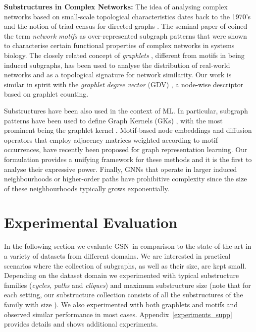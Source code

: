 \documentclass{article} \usepackage{iclr2021_conference,times}
\newcommand{\modelname}{GSN}
\begin{document}
\noindent\textbf{Substructures in Complex Networks: }The idea of analysing complex networks based on small-scale topological characteristics dates back to the 1970's and the notion of triad census for directed graphs \citep{holland1976local}. The seminal paper of \cite{milo2002network} coined the term \textit{network motifs} as over-represented subgraph patterns that were shown to characterise certain functional properties of complex networks in systems biology.  The closely related concept of  \textit{graphlets} \citep{prvzulj2004modeling, prvzulj2007biological, milenkovic2008uncovering, sarajlic2016graphlet}, different from motifs in being induced subgraphs, has been used to analyse the distribution of real-world networks and as a topological signature for network similarity. Our work is similar in spirit with the {\em graphlet degree vector} (GDV) \citep{prvzulj2007biological}, a node-wise descriptor based on graphlet counting. 

Substructures have been also used in the context of ML. In particular, subgraph patterns have been used to define Graph Kernels (GKs) \citep{horvath2004cyclic, shervashidze2009efficient, costa2010fast, DBLP:conf/icml/KriegeM12, nt2020graph}, with the most prominent being the graphlet kernel \citep{shervashidze2009efficient}. Motif-based node embeddings \citep{motif2vec, rossi-HONE-arxiv} and diffusion operators  \citep{motifnet, sankar2019meta, lee19-motif-attention}  that employ adjacency matrices weighted according to motif occurrences, have recently been proposed for graph representation learning. Our formulation provides a unifying framework for these methods and it is the first to analyse their expressive power. Finally, GNNs that operate in larger induced neighbourhoods \citep{li2019hierarchy, kim2019near} or higher-order paths \citep{flam2020neural} have prohibitive complexity since the size of these neighbourhoods typically grows exponentially. 



\section{Experimental Evaluation}\label{sec:experiments}


In the following section we evaluate \modelname\ in comparison to the state-of-the-art in a variety of datasets from different domains.  We are interested in practical scenarios where the collection of subgraphs, as well as their size, are kept small. Depending on the dataset domain we experimented with typical substructure families (\textit{cycles, paths} and \textit{cliques}) and maximum substructure size  (note that for each setting, our substructure collection consists of all the substructures of the family with size ). We also experimented with both graphlets and motifs and observed similar performance in most cases. 
Appendix~\ref{experiments_supp} provides details and shows additional experiments.
\end{document}

